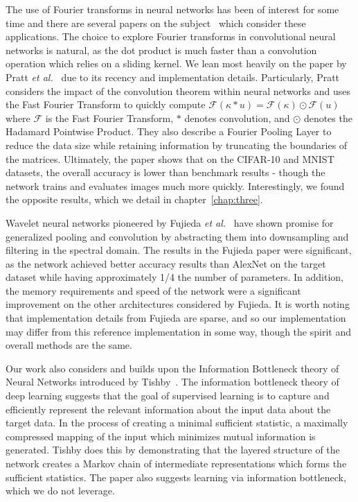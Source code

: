 The use of Fourier transforms in neural networks has been of interest for some time and there are several papers on the subject~\cite{osowski2002fourier, pratt2017fcnn, highlander2016very} which consider these applications.
The choice to explore Fourier transforms in convolutional neural networks is natural, as the dot product is much faster than a convolution operation which relies on a sliding kernel. 
We lean most heavily on the paper by Pratt \textit{et al.}~\cite{pratt2017fcnn} due to its recency and implementation details. 
Particularly, Pratt considers the impact of the convolution theorem within neural networks and uses the Fast Fourier Transform to quickly compute $\mathcal{F}(\kappa * u) = \mathcal{F}(\kappa) \odot \mathcal{F}(u)$ where $\mathcal{F}$ is the Fast Fourier Transform, $*$ denotes convolution, and $\odot$ denotes the Hadamard Pointwise Product.
They also describe a Fourier Pooling Layer to reduce the data size while retaining information by truncating the boundaries of the matrices.
Ultimately, the paper shows that on the CIFAR-10 and MNIST datasets, the overall accuracy is lower than benchmark results - though the network trains and evaluates images much more quickly.
Interestingly, we found the opposite results, which we detail in chapter~\ref{chap:three}.

Wavelet neural networks pioneered by Fujieda \textit{et al.}~\cite{fujieda2017wavelet} have shown promise for generalized pooling and convolution by abstracting them into downsampling and filtering in the spectral domain.
The results in the Fujieda paper were significant, as the network achieved better accuracy results than AlexNet on the target dataset while having approximately 1/4 the number of parameters.
In addition, the memory requirements and speed of the network were a significant improvement on the other architectures considered by Fujieda.
It is worth noting that implementation details from Fujieda are sparse, and so our implementation may differ from this reference implementation in some way, though the spirit and overall methods are the same.

Our work also considers and builds upon the Information Bottleneck theory of Neural Networks introduced by Tishby~\cite{tishby2015deep}.
The information bottleneck theory of deep learning suggests that the goal of supervised learning is to capture and efficiently represent the relevant information about the input data about the target data. 
In the process of creating a minimal sufficient statistic, a maximally compressed mapping of the input which minimizes mutual information is generated.
Tishby does this by demonstrating that the layered structure of the network creates a Markov chain of intermediate representations which forms the sufficient statistics.
The paper also suggests learning via information bottleneck, which we do not leverage.

